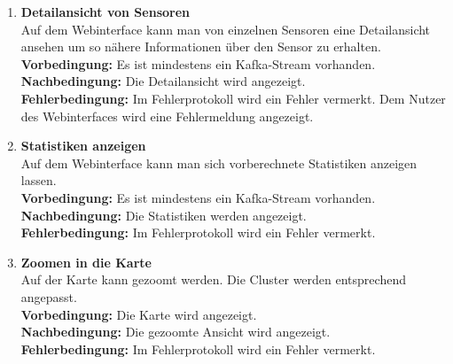 \begin{enumerate}[label=\textbf{PF\arabic{enumi}0}]
	\item \textbf{Detailansicht von Sensoren}\\
		Auf dem Webinterface kann man von einzelnen Sensoren eine Detailansicht ansehen um so nähere Informationen über den Sensor zu erhalten.\\
		\textbf{Vorbedingung:} Es ist mindestens ein Kafka-Stream vorhanden.\\
		\textbf{Nachbedingung:} Die Detailansicht wird angezeigt.\\
		\textbf{Fehlerbedingung:} Im Fehlerprotokoll wird ein Fehler vermerkt. Dem Nutzer des Webinterfaces wird eine Fehlermeldung angezeigt.
		
	\item \textbf{Statistiken anzeigen}\\
		Auf dem Webinterface kann man sich vorberechnete Statistiken anzeigen lassen.\\
		\textbf{Vorbedingung:} Es ist mindestens ein Kafka-Stream vorhanden.\\
		\textbf{Nachbedingung:} Die Statistiken werden angezeigt.\\
		\textbf{Fehlerbedingung:} Im Fehlerprotokoll wird ein Fehler vermerkt.
				
	\item \textbf{Zoomen in die Karte}\\
		Auf der Karte kann gezoomt werden. Die Cluster werden entsprechend angepasst.\\
		\textbf{Vorbedingung:} Die Karte wird angezeigt.\\
		\textbf{Nachbedingung:} Die gezoomte Ansicht wird angezeigt.\\
		\textbf{Fehlerbedingung:} Im Fehlerprotokoll wird ein Fehler vermerkt.
		
\end{enumerate}


